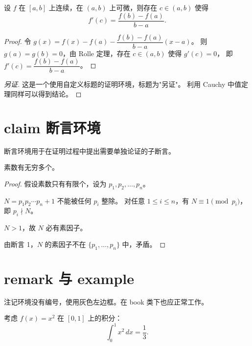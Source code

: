 \documentclass[12pt,a4paper]{ctexbook}
\begin{document}
\begin{theorem}[中值定理]
设 $f$ 在 $[a,b]$ 上连续，在 $(a,b)$ 上可微，则存在 $c\in(a,b)$ 使得
\[
  f'(c) = \frac{f(b)-f(a)}{b-a}.
\]
\end{theorem}

\begin{proof}
令 $g(x)=f(x)-f(a)-\dfrac{f(b)-f(a)}{b-a}(x-a)$。
则 $g(a)=g(b)=0$，由 Rolle 定理，存在 $c\in(a,b)$ 使得 $g'(c)=0$，
即 $f'(c)=\dfrac{f(b)-f(a)}{b-a}$。
\end{proof}

\begin{proof}[另证]
这是一个使用自定义标题的证明环境，标题为"另证"。
利用 Cauchy 中值定理同样可以得到结论。
\end{proof}

\section{claim 断言环境}

断言环境用于在证明过程中提出需要单独论证的子断言。

\begin{theorem}[素数无穷]
素数有无穷多个。
\end{theorem}

\begin{proof}
假设素数只有有限个，设为 $p_1, p_2, \ldots, p_n$。

\begin{claim}{$N = p_1 p_2 \cdots p_n + 1$ 不能被任何 $p_i$ 整除。}
  对任意 $1\leq i\leq n$，有 $N \equiv 1 \pmod{p_i}$，即 $p_i \nmid N$。
\end{claim}

\begin{claim*}
  $N > 1$，故 $N$ 必有素因子。
\end{claim*}

由断言 1，$N$ 的素因子不在 $\{p_1,\ldots,p_n\}$ 中，矛盾。
\end{proof}

\section{remark 与 example}

\begin{remark}
注记环境没有编号，使用灰色左边框。在 book 类下也应正常工作。
\end{remark}

\begin{example}
考虑 $f(x)=x^2$ 在 $[0,1]$ 上的积分：
\[
  \int_0^1 x^2\,dx = \frac{1}{3}.
\]
\end{example}
\end{document}
